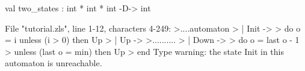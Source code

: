 \chklistingtrue
{}
\begin{ChkListingMsg}
val two_states : int * int * int -D-> int
\end{ChkListingMsg}
\begin{ChkListingErr}
File "tutorial.zls", line 1-12, characters 4-249:
>....automaton
>      | Init ->
>          do o = i unless (i > 0) then Up
>      | Up ->
>..........
>      | Down ->
>          do o = last o - 1
>          unless (last o = min) then Up
>      end
Type warning: the state Init in this automaton is unreachable.
\end{ChkListingErr}
